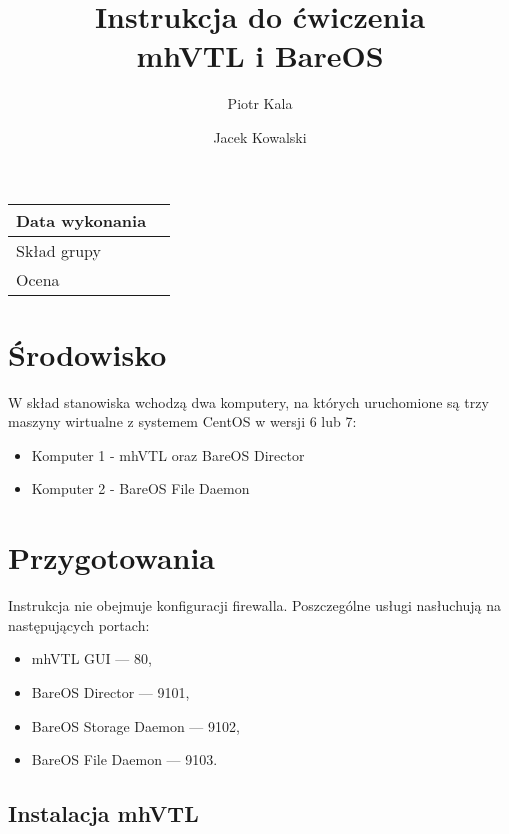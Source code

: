\documentclass[polish]{article}
\title{\textbf{Instrukcja do ćwiczenia}\\ mhVTL i BareOS}
\author{Piotr Kala \and Jacek Kowalski}
\begin{document}
\maketitle

\begin{tabular}{|l|p{}|}
\hline
Data wykonania & \\
\hline
Skład grupy & \\
\hline
Ocena & \\
\hline
\end{tabular}

\vspace{0.5cm}

\renewcommand{\labelenumi}{$\Box$\texttt{\theenumi}}
\renewcommand{\labelenumii}{$\Box$\texttt{\theenumii}}


\section{Środowisko}

W skład stanowiska wchodzą dwa komputery, na których uruchomione są
trzy maszyny wirtualne z systemem CentOS w wersji 6 lub 7:

\begin{itemize}
\item Komputer 1 - mhVTL oraz BareOS Director
\item Komputer 2 - BareOS File Daemon
\end{itemize}


\section{Przygotowania}

Instrukcja nie obejmuje konfiguracji firewalla.
Poszczególne usługi nasłuchują na następujących portach:

\begin{itemize}
\item mhVTL GUI --- 80,
\item BareOS Director --- 9101,
\item BareOS Storage Daemon --- 9102,
\item BareOS File Daemon --- 9103.
\end{itemize}


\subsection*{Instalacja mhVTL}
\end{document}
